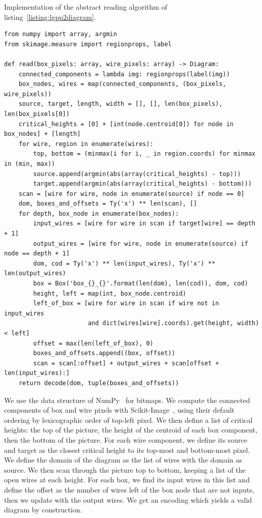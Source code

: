 \begin{python}
{\normalfont Implementation of the abstract reading algorithm of listing~\ref{listing:lgpp2diagram}.}

\begin{verbatim}
from numpy import array, argmin
from skimage.measure import regionprops, label

def read(box_pixels: array, wire_pixels: array) -> Diagram:
    connected_components = lambda img: regionprops(label(img))
    box_nodes, wires = map(connected_components, (box_pixels, wire_pixels))
    source, target, length, width = [], [], len(box_pixels), len(box_pixels[0])
    critical_heights = [0] + [int(node.centroid[0]) for node in box_nodes] + [length]
    for wire, region in enumerate(wires):
        top, bottom = (minmax(i for i, _ in region.coords) for minmax in (min, max))
        source.append(argmin(abs(array(critical_heights) - top)))
        target.append(argmin(abs(array(critical_heights) - bottom)))
    scan = [wire for wire, node in enumerate(source) if node == 0]
    dom, boxes_and_offsets = Ty('x') ** len(scan), []
    for depth, box_node in enumerate(box_nodes):
        input_wires = [wire for wire in scan if target[wire] == depth + 1]
        output_wires = [wire for wire, node in enumerate(source) if node == depth + 1]
        dom, cod = Ty('x') ** len(input_wires), Ty('x') ** len(output_wires)
        box = Box('box_{}_{}'.format(len(dom), len(cod)), dom, cod)
        height, left = map(int, box_node.centroid)
        left_of_box = [wire for wire in scan if wire not in input_wires
                       and dict(wires[wire].coords).get(height, width) < left]
        offset = max(len(left_of_box), 0)
        boxes_and_offsets.append((box, offset))
        scan = scan[:offset] + output_wires + scan[offset + len(input_wires):]
    return decode(dom, tuple(boxes_and_offsets))
\end{verbatim}
\end{python}

We use the  data structure of NumPy~\cite{VanDerWaltEtAl11} for bitmaps.
We compute the connected components of box and wire pixels with Scikit-Image~\cite{WaltEtAl14}, using their default ordering by lexicographic order of top-left pixel.
We then define a list of critical heights: the top of the picture, the height of the centroid of each box component, then the bottom of the picture.
For each wire component, we define its source and target as the closest critical height to its top-most and bottom-most pixel.
We define the domain of the diagram as the list of wires with the domain as source.
We then scan through the picture top to bottom, keeping a list  of the open wires at each height.
For each box, we find its input wires in this list and define the offset as the number of wires left of the box node that are not inputs, then we update  with the output wires.
We get an encoding  which yields a valid diagram by construction.

